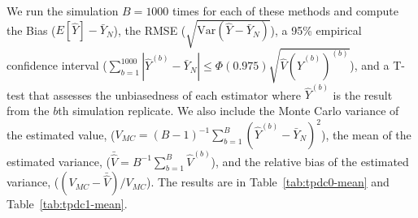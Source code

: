 \documentclass[12pt]{article}
\newcommand{\Var}{{\text{Var}}}
\renewcommand{\bf}[1]{\mathbf{#1}}
\begin{document}
%

We run the simulation $B = 1000$ times for each of these methods and compute the
Bias ($E[\hat Y] - \bar Y_N$), the RMSE ($\sqrt{\Var(\hat Y - \bar Y_N)}$), a 95\%
empirical confidence interval ($\sum_{b = 1}^{1000} |\hat Y^{(b)} - \bar Y_N| \leq 
\Phi(0.975)\sqrt{\hat V(\hat Y^{(b)})^{(b)}}$), and a T-test that assesses the
unbiasedness of each estimator where $\hat Y^{(b)}$ is the result from the $b$th
simulation replicate. We also include the Monte Carlo variance of the estimated
value, ($V_{MC} = (B - 1)^{-1} \sum_{b = 1}^B (\hat Y^{(b)} - \bar Y_N)^2$), the
mean of the estimated variance, 
($\bar{\hat V} = B^{-1} \sum_{b = 1}^B \hat V^{(b)}$), and the relative bias of
the estimated variance, ($(V_{MC} - \bar{\hat V}) / V_{MC}$). The results are in
Table~\ref{tab:tpdc0-mean} and Table~\ref{tab:tpdc1-mean}.
\end{document}
